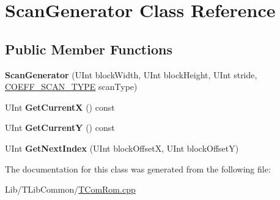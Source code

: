 \hypertarget{class_scan_generator}{}\section{Scan\+Generator Class Reference}
\label{class_scan_generator}
\subsection*{Public Member Functions}
\begin{DoxyCompactItemize}
\item 
\mbox{\label{class_scan_generator_a4973c3abbc0dc52abbe6d2295f0af205}} 
{\bfseries Scan\+Generator} (U\+Int block\+Width, U\+Int block\+Height, U\+Int stride, \hyperlink{_type_def_8h_a30c02674008b9ee63cee39a5e1261884}{C\+O\+E\+F\+F\+\_\+\+S\+C\+A\+N\+\_\+\+T\+Y\+PE} scan\+Type)
\item 
\mbox{\label{class_scan_generator_a5fa6f7d0ee7921f86b73bfe2140d041b}} 
U\+Int {\bfseries Get\+CurrentX} () const
\item 
\mbox{\label{class_scan_generator_a55b8fb71f1ce8d4febd74e90c79fd64b}} 
U\+Int {\bfseries Get\+CurrentY} () const
\item 
\mbox{\label{class_scan_generator_aeb94a86412e58e19a99f41fce4d7189b}} 
U\+Int {\bfseries Get\+Next\+Index} (U\+Int block\+OffsetX, U\+Int block\+OffsetY)
\end{DoxyCompactItemize}


The documentation for this class was generated from the following file\+:\begin{DoxyCompactItemize}
\item 
Lib/\+T\+Lib\+Common/\hyperlink{_t_com_rom_8cpp}{T\+Com\+Rom.\+cpp}\end{DoxyCompactItemize}
